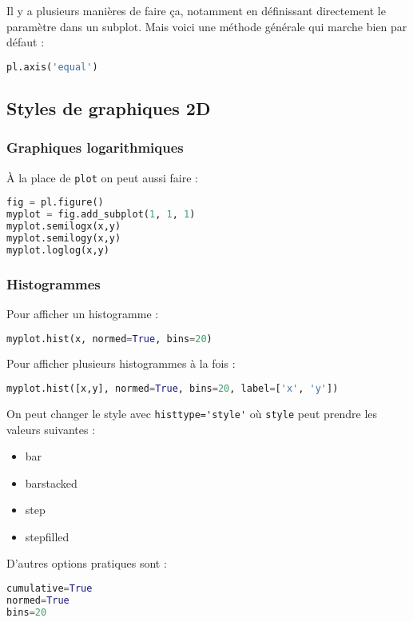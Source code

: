 \documentclass[a4paper,twoside]{article}
\begin{document}
Il y a plusieurs manières de faire ça, notamment en définissant directement le paramètre dans un subplot. Mais voici une méthode générale qui marche bien par défaut : 
\begin{lstlisting}[language=python]
pl.axis('equal')
\end{lstlisting}


\subsection{Styles de graphiques 2D}
\subsubsection{Graphiques logarithmiques}

À la place de \verb|plot| on peut aussi faire :
\begin{lstlisting}[language=python]
fig = pl.figure()
myplot = fig.add_subplot(1, 1, 1)
myplot.semilogx(x,y)
myplot.semilogy(x,y)
myplot.loglog(x,y)
\end{lstlisting}

\subsubsection{Histogrammes}
Pour afficher un histogramme :
\begin{lstlisting}[language=python]
myplot.hist(x, normed=True, bins=20)
\end{lstlisting}

Pour afficher plusieurs histogrammes à la fois :
\begin{lstlisting}[language=python]
myplot.hist([x,y], normed=True, bins=20, label=['x', 'y'])
\end{lstlisting}

\bigskip

On peut changer le style avec \verb|histtype='style'| où \verb|style| peut prendre les valeurs suivantes :
\begin{itemize}
\item bar
\item barstacked
\item step
\item stepfilled
\end{itemize}

D'autres options pratiques sont :
\begin{lstlisting}[language=python]
cumulative=True
normed=True
bins=20
\end{lstlisting}
\end{document}
